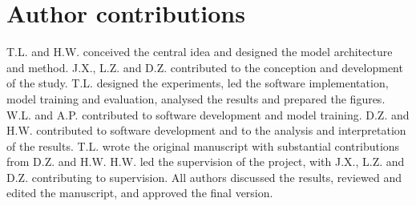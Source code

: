 \section{Author contributions}

T.L. and H.W. conceived the central idea and designed the model architecture and method.
J.X., L.Z. and D.Z. contributed to the conception and development of the study.
T.L. designed the experiments, led the software implementation, model training and evaluation, analysed the results and prepared the figures.
W.L. and A.P. contributed to software development and model training.
D.Z. and H.W. contributed to software development and to the analysis and interpretation of the results.
T.L. wrote the original manuscript with substantial contributions from D.Z. and H.W.
H.W. led the supervision of the project, with J.X., L.Z. and D.Z. contributing to supervision.
All authors discussed the results, reviewed and edited the manuscript, and approved the final version.
